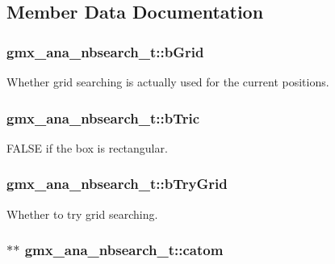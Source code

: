 \subsection{\-Member \-Data \-Documentation}
\hypertarget{structgmx__ana__nbsearch__t_aa5f4421a72fde1f9f515517c52d23825}{
\subsubsection[{b\-Grid}]{ {\bf gmx\-\_\-ana\-\_\-nbsearch\-\_\-t\-::b\-Grid}}}\label{structgmx__ana__nbsearch__t_aa5f4421a72fde1f9f515517c52d23825}
\-Whether grid searching is actually used for the current positions. \hypertarget{structgmx__ana__nbsearch__t_a6b7965d058997c911314927f081ae0d2}{
\subsubsection[{b\-Tric}]{ {\bf gmx\-\_\-ana\-\_\-nbsearch\-\_\-t\-::b\-Tric}}}\label{structgmx__ana__nbsearch__t_a6b7965d058997c911314927f081ae0d2}
\-F\-A\-L\-S\-E if the box is rectangular. \hypertarget{structgmx__ana__nbsearch__t_ad65659eb683d42492b2115a7822a2cd6}{
\subsubsection[{b\-Try\-Grid}]{ {\bf gmx\-\_\-ana\-\_\-nbsearch\-\_\-t\-::b\-Try\-Grid}}}\label{structgmx__ana__nbsearch__t_ad65659eb683d42492b2115a7822a2cd6}
\-Whether to try grid searching. \hypertarget{structgmx__ana__nbsearch__t_a9f501145dddc01517037ada5a01056f8}{
\subsubsection[{catom}]{$\ast$$\ast$ {\bf gmx\-\_\-ana\-\_\-nbsearch\-\_\-t\-::catom}}}\label{structgmx__ana__nbsearch__t_a9f501145dddc01517037ada5a01056f8}
